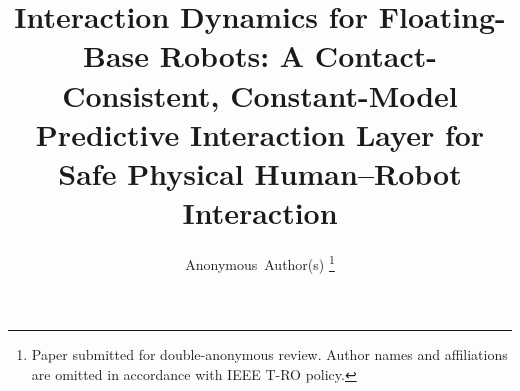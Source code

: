 \documentclass[journal]{IEEEtran}
\begin{document}
\title{Interaction Dynamics for Floating-Base Robots:
       A Contact-Consistent, Constant-Model Predictive
       Interaction Layer for Safe Physical Human--Robot Interaction}

\author{Anonymous~Author(s)%
\thanks{Paper submitted for double-anonymous review. Author names and
affiliations are omitted in accordance with IEEE T-RO policy.}}

\maketitle
\thispagestyle{empty}
\pagestyle{empty}


\end{document}
